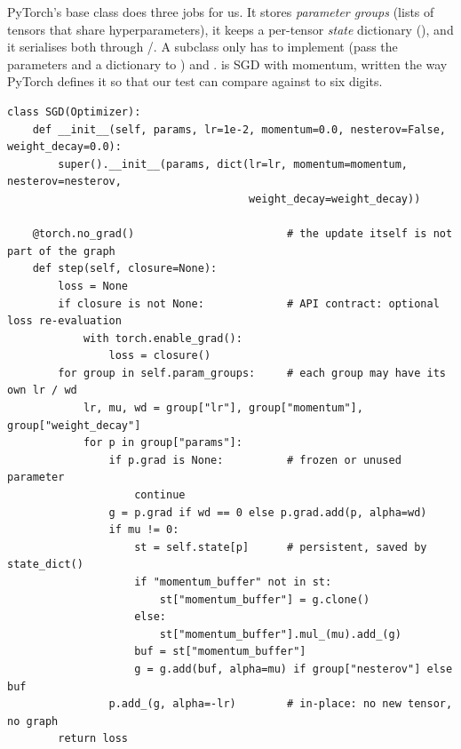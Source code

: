 PyTorch's  base class does three jobs for us. It stores
\emph{parameter groups} (lists of tensors that share hyperparameters), it keeps a per-tensor
\emph{state} dictionary (), and it serialises both through
/. A subclass only has to implement
 (pass the parameters and a  dictionary to ) and
.  is SGD with momentum, written the way PyTorch defines it so
that our test can compare against  to six digits.

\begin{lstlisting}[caption={SGD with heavy-ball or Nesterov momentum (from \texttt{llmsys/optim.py}).},label={lst:optim:sgd}]
class SGD(Optimizer):
    def __init__(self, params, lr=1e-2, momentum=0.0, nesterov=False, weight_decay=0.0):
        super().__init__(params, dict(lr=lr, momentum=momentum, nesterov=nesterov,
                                      weight_decay=weight_decay))

    @torch.no_grad()                        # the update itself is not part of the graph
    def step(self, closure=None):
        loss = None
        if closure is not None:             # API contract: optional loss re-evaluation
            with torch.enable_grad():
                loss = closure()
        for group in self.param_groups:     # each group may have its own lr / wd
            lr, mu, wd = group["lr"], group["momentum"], group["weight_decay"]
            for p in group["params"]:
                if p.grad is None:          # frozen or unused parameter
                    continue
                g = p.grad if wd == 0 else p.grad.add(p, alpha=wd)
                if mu != 0:
                    st = self.state[p]      # persistent, saved by state_dict()
                    if "momentum_buffer" not in st:
                        st["momentum_buffer"] = g.clone()
                    else:
                        st["momentum_buffer"].mul_(mu).add_(g)
                    buf = st["momentum_buffer"]
                    g = g.add(buf, alpha=mu) if group["nesterov"] else buf
                p.add_(g, alpha=-lr)        # in-place: no new tensor, no graph
        return loss
\end{lstlisting}

